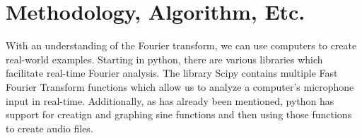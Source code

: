 \documentclass[10pt]{article}
\begin{document}
%
%
%
%
%



\section{Methodology, Algorithm, Etc.}

\noindent \hspace{\parindent} With an understanding of the Fourier transform, we can use computers to create real-world examples. Starting in python, there are various libraries which facilitate real-time Fourier analysis. The library Scipy contains multiple Fast Fourier Transform functions which allow us to analyze a computer's microphone input in real-time. Additionally, as has already been mentioned, python has support for creatign and graphing sine functions and then using those functions to create audio files.


\end{document}
